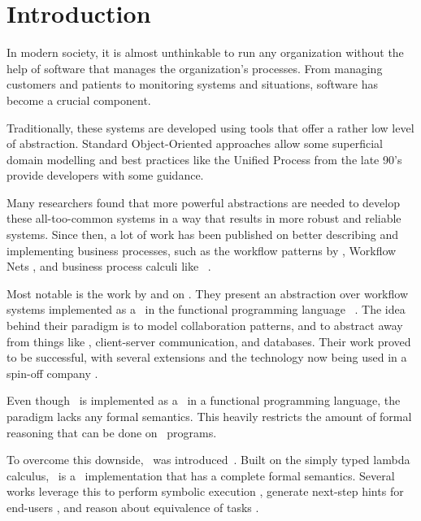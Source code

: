 
\section{Introduction}
\label{sec:introduction}

In modern society, it is almost unthinkable to run any organization without the help of software that manages the organization's processes.
From managing customers and patients to monitoring systems and situations, software has become a crucial component.

Traditionally, these systems are developed using tools that offer a rather low level of abstraction.
Standard Object-Oriented approaches allow some superficial domain modelling and best practices like the Unified Process from the late 90's provide developers with some guidance.

Many researchers found that more powerful abstractions are needed to develop these all-too-common systems in a way that results in more robust and reliable systems.
Since then, a lot of work has been published on better describing and implementing business processes, such as the workflow patterns by \citeauthor{journals/dpd/AalstHKB03}, Workflow Nets \cite{journals/jcsc/Aalst98}, and business process calculi like \BPEL\ \cite{bpel}.

Most notable is the work by \citet{conf/ifl/KoopmanPA08} and \citet{conf/ppdp/PlasmeijerLMAK12} on \ITASKS.
They present an abstraction over workflow systems implemented as a \DSL\ in the functional programming language \CLEAN\ \cite{plasmeijer2002clean}.
The idea behind their paradigm is to model collaboration patterns, and to abstract away from things like \GUI, client-server communication, and databases.
Their work proved to be successful, with several extensions and the technology now being used in a spin-off company \cite{com/tss/viia}.

Even though \ITASKS\ is implemented as a \DSL\ in a functional programming language, the paradigm lacks any formal semantics.
This heavily restricts the amount of formal reasoning that can be done on \ITASKS\ programs.

To overcome this downside, \TOPHAT\ was introduced~\cite{conf/ppdp/SteenvoordenNK19}.
Built on the simply typed lambda calculus,
\TOPHAT\ is a \TOP\ implementation that has a complete formal semantics.
Several works leverage this to perform symbolic execution \cite{conf/ifl/NausSK19},
generate next-step hints for end-users \cite{conf/sfp/NausS20},
and reason about equivalence of tasks \cite{conf/sfp/KlijnsmaS22}.

